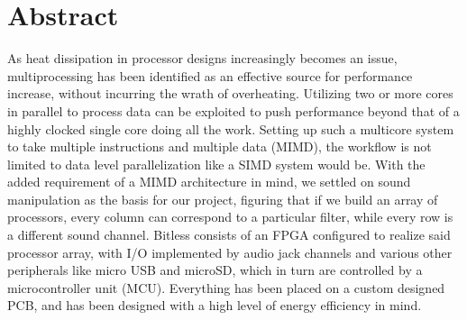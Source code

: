 
\section*{Abstract}
As heat dissipation in processor designs increasingly becomes an issue,
multiprocessing has been identified as an effective source for performance
increase, without incurring the wrath of overheating. Utilizing two or more
cores in parallel to process data can be exploited to push performance beyond
that of a highly clocked single core doing all the work.
Setting up such a multicore system to take multiple instructions and multiple data (MIMD), the workflow
is not limited to data level parallelization like a SIMD system would be. With the added requirement of a MIMD architecture in mind, we settled on sound manipulation as the basis for our project,
figuring that if we build an array of processors, every column can correspond
to a particular filter, while every row is a different sound channel.\newline
{}
Bitless consists of an FPGA configured to realize said processor array, with
I/O implemented by audio jack channels and various other peripherals like micro
USB and microSD, which in turn are controlled by a microcontroller unit (MCU).
Everything has been placed on a custom designed PCB, and has been designed with
a high level of energy efficiency in mind.\newline
{}
